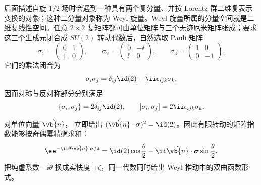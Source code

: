 后面描述自旋 $1/2$ 场时会遇到一种具有两个复分量、并按 Lorentz 群二维复表示变换的对象；这种二分量对象称为 Weyl 旋量。Weyl 旋量所属的分量空间就是二维复线性空间。任意 $2\times2$ 复矩阵都可由单位矩阵与三个无迹厄米矩阵张成；要求这三个生成元闭合成 $SU(2)$ 转动代数后，自然选取 Pauli 矩阵
\begin{equation}
 \sigma_1=\begin{pmatrix}0&1\\1&0\end{pmatrix},\qquad
 \sigma_2=\begin{pmatrix}0&-\ii\\ \ii&0\end{pmatrix},\qquad
 \sigma_3=\begin{pmatrix}1&0\\0&-1\end{pmatrix}.
 \label{eq:pauli-explicit-r10}
\end{equation}
它们的乘法闭合为
\begin{equation}
 {
 \sigma_i\sigma_j
 =\delta_{ij}\id(2)+\ii\epsilon_{ijk}\sigma_k,}
 \label{eq:pauli-product-proof-r10}
\end{equation}
因而对称与反对称部分分别满足
\begin{equation}
 {
 \{\sigma_i,\sigma_j\}=2\delta_{ij}\id(2),
 \qquad
 [\sigma_i,\sigma_j]=2\ii\epsilon_{ijk}\sigma_k.}
 \label{eq:pauli-comm-anticomm-r10}
\end{equation}

对单位向量 $\hat{\vb{n}}$， 立即给出
$(\hat{\vb{n}}\cdot\boldsymbol\sigma)^2=\id(2)$。因此有限转动的矩阵指数能够按奇偶幂精确求和：
\begin{equation}
 {
 \ee^{-\ii\theta\hat{\vb{n}}\cdot\boldsymbol\sigma/2}
 =\id(2)\cos\frac{\theta}{2}
 -\ii\hat{\vb{n}}\cdot\boldsymbol\sigma\sin\frac{\theta}{2}.}
 \label{eq:pauli-exponential-r68}
\end{equation}
把纯虚系数 $-\ii\theta$ 换成实快度 $\pm\zeta$，同一代数同时给出 Weyl 推动中的双曲函数形式。


